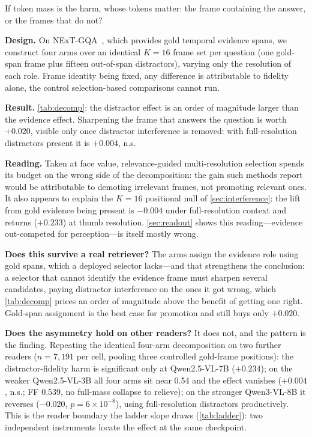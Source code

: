 \documentclass[10pt,twocolumn,letterpaper]{article}
\begin{document}
If token mass is the harm, whose tokens matter: the frame containing the answer, or the frames that do not?

\noindent\textbf{Design.} On NExT-GQA~\cite{xiao2024nextgqa}, which provides gold temporal evidence spans, we construct four arms over an identical $K{=}16$ frame set per question (one gold-span frame plus fifteen out-of-span distractors), varying only the resolution of each role. Frame identity being fixed, any difference is attributable to fidelity alone, the control selection-based comparisons cannot run.

\noindent\textbf{Result.} \cref{tab:decomp}: the distractor effect is an order of magnitude larger than the evidence effect. Sharpening the frame that answers the question is worth $+0.020$, visible only once distractor interference is removed: with full-resolution distractors present it is $+0.004$, n.s.

\noindent\textbf{Reading.} Taken at face value, relevance-guided multi-resolution selection spends its budget on the wrong side of the decomposition: the gain such methods report would be attributable to demoting irrelevant frames, not promoting relevant ones. It also appears to explain the $K{=}16$ positional null of \cref{sec:interference}: the lift from gold evidence being present is $-0.004$ under full-resolution context and returns ($+0.233$) at thumb resolution. \cref{sec:readout} shows this reading---evidence out-competed for perception---is itself mostly wrong.

\noindent\textbf{Does this survive a real retriever?} The arms assign the evidence role using gold spans, which a deployed selector lacks---and that strengthens the conclusion: a selector that cannot identify the evidence frame must sharpen several candidates, paying distractor interference on the ones it got wrong, which \cref{tab:decomp} prices an order of magnitude above the benefit of getting one right. Gold-span assignment is the best case for promotion and still buys only $+0.020$.

\noindent\textbf{Does the asymmetry hold on other readers?} It does not, and the pattern is the finding. Repeating the identical four-arm decomposition on two further readers ($n{=}7{,}191$ per cell, pooling three controlled gold-frame positions): the distractor-fidelity harm is significant only at Qwen2.5-VL-7B ($+0.234$); on the weaker Qwen2.5-VL-3B all four arms sit near 0.54 and the effect vanishes ($+0.004$, n.s.; FF 0.539, no full-mass collapse to relieve); on the stronger Qwen3-VL-8B it reverses ($-0.020$, $p{=}6{\times}10^{-8}$), using full-resolution distractors productively. This is the reader boundary the ladder slope draws (\cref{tab:ladder}): two independent instruments locate the effect at the same checkpoint.
\end{document}
